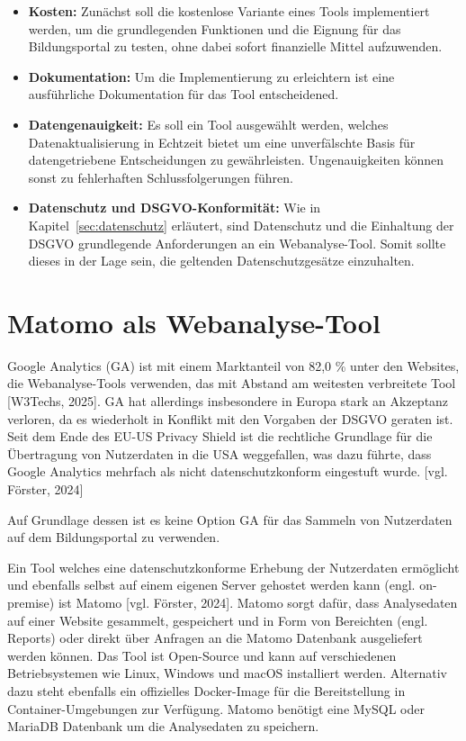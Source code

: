 \begin{itemize}
    \item \textbf{Kosten:} Zunächst soll die kostenlose Variante eines Tools implementiert werden, um die grundlegenden Funktionen und die Eignung für das Bildungsportal zu testen, ohne dabei sofort finanzielle Mittel aufzuwenden.
    \item \textbf{Dokumentation:} Um die Implementierung zu erleichtern ist eine ausführliche Dokumentation für das Tool entscheidened.
    \item \textbf{Datengenauigkeit:} Es soll ein Tool ausgewählt werden, welches Datenaktualisierung in Echtzeit bietet um eine unverfälschte Basis für datengetriebene Entscheidungen zu gewährleisten. Ungenauigkeiten können sonst zu fehlerhaften Schlussfolgerungen führen.
    \item \textbf{Datenschutz und DSGVO-Konformität:} Wie in Kapitel~\ref{sec:datenschutz} erläutert, sind Datenschutz und die Einhaltung der DSGVO grundlegende Anforderungen an ein Webanalyse-Tool. Somit sollte dieses in der Lage sein, die geltenden Datenschutzgesätze einzuhalten.
\end{itemize}

\section{Matomo als Webanalyse-Tool}
Google Analytics (GA) ist mit einem Marktanteil von 82,0 \% unter den Websites, die Webanalyse-Tools verwenden, das mit Abstand am weitesten verbreitete Tool [W3Techs, 2025]. GA hat allerdings insbesondere in Europa stark an Akzeptanz verloren, da es wiederholt in Konflikt mit den Vorgaben der DSGVO geraten ist. Seit dem Ende des EU-US Privacy Shield ist die rechtliche Grundlage für die Übertragung von Nutzerdaten in die USA weggefallen, was dazu führte, dass Google Analytics mehrfach als nicht datenschutzkonform eingestuft wurde. [vgl. Förster, 2024]

Auf Grundlage dessen ist es keine Option GA für das Sammeln von Nutzerdaten auf dem Bildungsportal zu verwenden. 

Ein Tool welches eine datenschutzkonforme Erhebung der Nutzerdaten ermöglicht und ebenfalls selbst auf einem eigenen Server gehostet werden kann (engl. on-premise) ist Matomo [vgl. Förster, 2024]. Matomo sorgt dafür, dass Analysedaten auf einer Website gesammelt, gespeichert und in Form von Bereichten (engl. Reports) oder direkt über Anfragen an die Matomo Datenbank ausgeliefert werden können.
Das Tool ist Open-Source und kann auf verschiedenen Betriebsystemen wie Linux, Windows und macOS installiert werden. Alternativ dazu steht ebenfalls ein offizielles Docker-Image für die Bereitstellung in Container-Umgebungen zur Verfügung. Matomo benötigt eine MySQL oder MariaDB Datenbank um die Analysedaten zu speichern. 

